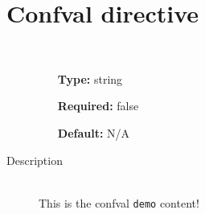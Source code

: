 \documentclass[11pt]{report}
\begin{document}
\label{}
        \section{Confval directive}
    \begin{description}
    \item[\textttdemo]
    \hfill \\
    \begin{itemize}
        \item[\textbf{Type:}] string
        \item[\textbf{Required:}] false        \item[\textbf{Default:}] N/A\end{itemize}

    \item[Description]
    \hfill \\
This is the confval \texttt{demo} content!
\end{description}
\end{document}
